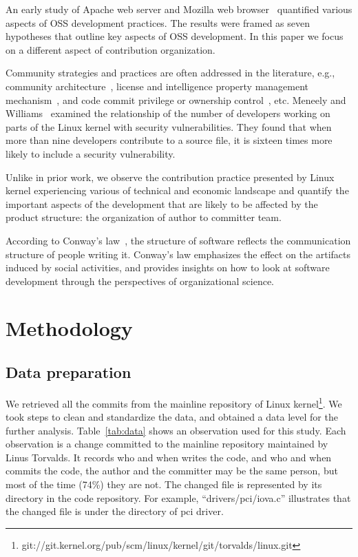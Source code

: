 \documentclass{sig-alternate-05-2015}
\begin{document}
An early study of Apache web server and Mozilla web browser~\cite{MFH02}
quantified various aspects of OSS development practices. The
results were framed as seven hypotheses that outline key aspects of
OSS development.  In this paper we focus on a different aspect of
 contribution organization. 

Community strategies and practices are often addressed in the
literature, e.g., community architecture~\cite{MFH02,YK03}, license
and intelligence property management mechanism~\cite{Hippel03}, and
code commit privilege or ownership control~\cite{MFH02,YK03,KSL03}, etc.
  Meneely  and  Williams~\cite{meneely09}  examined  the  relationship  
of  the  number  of  developers  working  on  parts  of  the
Linux kernel with security vulnerabilities.  They found
that when more than nine developers contribute to a source
file, it is sixteen times more likely to include a security vulnerability.

Unlike in prior work, we observe the contribution practice 
presented by Linux kernel experiencing various of technical and economic landscape 
and quantify the important aspects of the development that are likely 
to be affected by the product structure:
 the organization of author to committer team.

According to Conway's law~\cite{conway}, the structure of software reflects 
the communication structure of people writing it.
Conway's law emphasizes the effect on the artifacts induced by social activities, 
and provides insights on how to look at software development
through the perspectives of organizational science.

\section{Methodology}\label{s:method}
\subsection{Data preparation}
We retrieved all the commits from the mainline repository of Linux 
kernel\footnote{git://git.kernel.org/pub/scm/linux/kernel/git/torvalds/linux.git}.
We took steps to clean and standardize the data, and obtained
a data level for the further analysis.
Table~\ref{tab:data} shows an observation used for this study.
Each observation is a change committed to the mainline repository
maintained by Linus Torvalds. It records who and when writes the code,
and who and when commits the code, the author and the committer may be
the same person, but most of the time (74\%) they are not.
The changed file is represented by its directory in the code repository.
For example, ``drivers/pci/iova.c'' illustrates that the changed file
is under the directory of pci driver.
\end{document}

